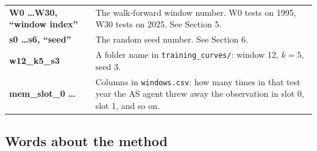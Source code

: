 \documentclass[11pt,a4paper]{article}
\begin{document}
\begin{longtable}{>{\bfseries}p{2.6cm} p{12.2cm}}
W0 \ldots W30, ``window index'' & The walk-forward window number. W0 tests on 1995,
  W30 tests on 2025. See Section 5. \\
s0 \ldots s6, ``seed'' & The random seed number. See Section 6. \\
w12\_k5\_s3 & A folder name in \texttt{training\_curves/}: window 12, $k=5$, seed 3. \\
mem\_slot\_0 \ldots & Columns in \texttt{windows.csv}: how many times in that test year the
  AS agent threw away the observation in slot 0, slot 1, and so on. \\
\bottomrule
\end{longtable}

\subsection{Words about the method}
\end{document}

